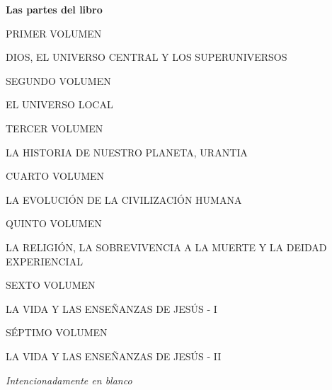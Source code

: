 \documentclass[twoside, 11pt]{book}
\begin{document}
\begin{center}
	{\huge\bfseries Las partes del libro\par}
	\vspace{1cm}
	{\scshape\large PRIMER VOLUMEN\par}
	{\scshape\Large DIOS, EL UNIVERSO CENTRAL Y LOS SUPERUNIVERSOS\par}
	\vspace{1cm}
	
	{\scshape\large SEGUNDO VOLUMEN \par}
	{\scshape\Large EL UNIVERSO LOCAL\par}
	\vspace{1cm}
	
	{\scshape\large TERCER VOLUMEN \par}
	{\scshape\Large LA HISTORIA DE NUESTRO PLANETA, URANTIA\par}
	\vspace{1cm}
	
	{\scshape\large CUARTO VOLUMEN \par}
	{\scshape\Large LA EVOLUCIÓN DE LA CIVILIZACIÓN HUMANA\par}
	\vspace{1cm}
	
	{\scshape\large QUINTO VOLUMEN \par}
	{\scshape\Large LA RELIGIÓN, LA SOBREVIVENCIA A LA MUERTE Y LA DEIDAD EXPERIENCIAL\par}
	\vspace{1cm}
	
	{\scshape\large SEXTO VOLUMEN \par}
	{\scshape\Large LA VIDA Y LAS ENSEÑANZAS DE JESÚS - I\par}
	\vspace{1cm}
	
	{\scshape\large SÉPTIMO VOLUMEN \par}
	{\scshape\Large LA VIDA Y LAS ENSEÑANZAS DE JESÚS - II\par}
\end{center}
	
\newpage
\begin{center}
	{\small \textit {Intencionadamente en blanco}\par}
\end{center}
\newpage

\pagestyle{empty}


\tableofcontents

\end{document}
